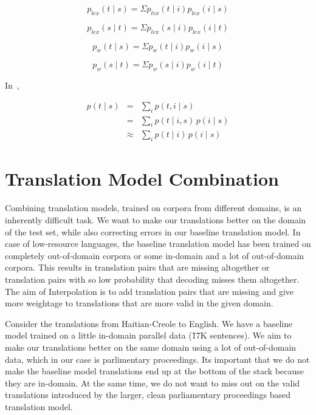 \begin{equation}
 p_{lex}(t \mid s) = \Sigma p_{lex}(t \mid i) p_{lex}(i \mid s)
\end{equation}

\begin{equation}
	p_{lex}(s \mid t) = \Sigma p_{lex}(s \mid i) p_{lex}(i \mid t)
\end{equation}

\begin{equation}
	p_w(t \mid s) = \Sigma p_w(t \mid i) p_w(i \mid s)
\end{equation}

\begin{equation}
	p_w(s \mid t) = \Sigma p_w(s \mid i) p_w(i \mid t)
\end{equation}

In~\cite{Cohn:07}, 

\begin{eqnarray*}
p(t \mid s)&=&\sum_{i}{p(t, i \mid s)}\\
&=& \sum_{i}{p(t \mid i, s)\,p(i \mid s)}\\
&\approx& \sum_{i}{p(t \mid i)\,p(i \mid s)}
\end{eqnarray*}

\section{Translation Model Combination}
\label{sec:interpolation}

	Combining translation models, trained on corpora from different domains, is an inherently difficult task. We want to make our translations better on the domain of the test set, while also correcting errors in our baseline translation model. In case of low-resource languages, the baseline translation model has been trained on completely out-of-domain corpora or some in-domain and a lot of out-of-domain corpora. This results in translation pairs that are missing altogether or translation pairs with so low probability that decoding misses them altogether. The aim of Interpolation is to add translation pairs that are missing and give more weightage to translations that are more valid in the given domain. 

	Consider the translations from Haitian-Creole to English. We have a baseline model trained on a little in-domain parallel data (\~17K sentences). We aim to make our translations better on the same domain using a lot of out-of-domain data, which in our case is parlimentary proceedings. Its important that we do not make the baseline model translations end up at the bottom of the stack because they are in-domain. At the same time, we do not want to miss out on the valid translations introduced by the larger, clean parliamentary proceedings based translation model. 

